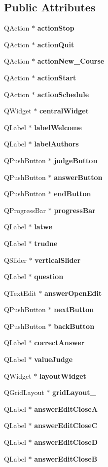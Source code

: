 \subsection*{Public Attributes}
\begin{DoxyCompactItemize}
\item 
Q\-Action $\ast$ {\bf action\-Stop}
\item 
Q\-Action $\ast$ {\bf action\-Quit}
\item 
Q\-Action $\ast$ {\bf action\-New\-\_\-\-Course}
\item 
Q\-Action $\ast$ {\bf action\-Start}
\item 
Q\-Action $\ast$ {\bf action\-Schedule}
\item 
Q\-Widget $\ast$ {\bf central\-Widget}
\item 
Q\-Label $\ast$ {\bf label\-Welcome}
\item 
Q\-Label $\ast$ {\bf label\-Authors}
\item 
Q\-Push\-Button $\ast$ {\bf judge\-Button}
\item 
Q\-Push\-Button $\ast$ {\bf answer\-Button}
\item 
Q\-Push\-Button $\ast$ {\bf end\-Button}
\item 
Q\-Progress\-Bar $\ast$ {\bf progress\-Bar}
\item 
Q\-Label $\ast$ {\bf latwe}
\item 
Q\-Label $\ast$ {\bf trudne}
\item 
Q\-Slider $\ast$ {\bf vertical\-Slider}
\item 
Q\-Label $\ast$ {\bf question}
\item 
Q\-Text\-Edit $\ast$ {\bf answer\-Open\-Edit}
\item 
Q\-Push\-Button $\ast$ {\bf next\-Button}
\item 
Q\-Push\-Button $\ast$ {\bf back\-Button}
\item 
Q\-Label $\ast$ {\bf correct\-Answer}
\item 
Q\-Label $\ast$ {\bf value\-Judge}
\item 
Q\-Widget $\ast$ {\bf layout\-Widget}
\item 
Q\-Grid\-Layout $\ast$ {\bf grid\-Layout\-\_}
\item 
Q\-Label $\ast$ {\bf answer\-Edit\-Close\-A}
\item 
Q\-Label $\ast$ {\bf answer\-Edit\-Close\-C}
\item 
Q\-Label $\ast$ {\bf answer\-Edit\-Close\-D}
\item 
Q\-Label $\ast$ {\bf answer\-Edit\-Close\-B}

\end{DoxyCompactItemize}
